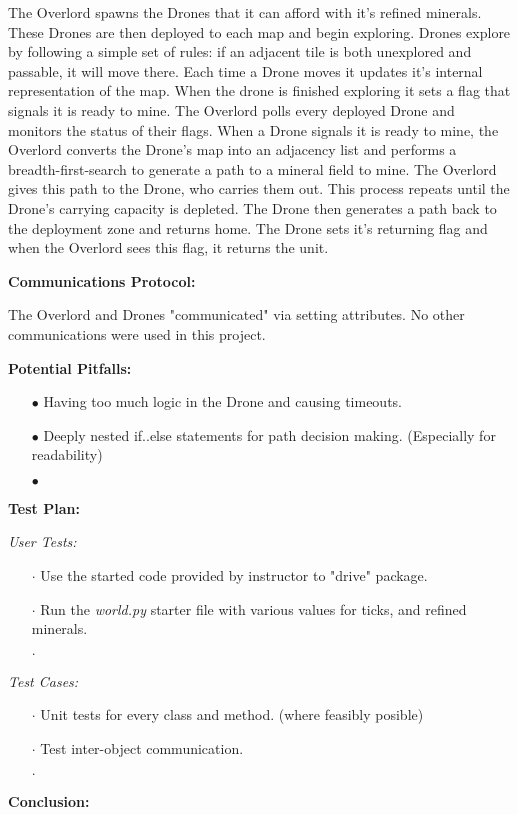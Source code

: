 \documentclass{article}
\begin{document}
The Overlord spawns the Drones that it can afford with it's refined 
minerals.  These Drones are then deployed to each map and begin exploring.
Drones explore by following a simple set of rules: if an adjacent tile is
both unexplored and passable, it will move there. Each time a Drone moves
it updates it's internal representation of the map. When the drone is
finished exploring it sets a flag that signals it is ready to mine.  The 
Overlord polls every deployed Drone and monitors the status of their flags.
When a Drone signals it is ready to mine, the Overlord converts the Drone's
map into an adjacency list and performs a breadth-first-search to generate 
a path to a mineral field to mine.  The Overlord gives this path to the 
Drone, who carries them out. This process repeats until the Drone's 
carrying capacity is depleted.  The Drone then generates a path back to the
deployment zone and returns home.  The Drone sets it's returning flag and
when the Overlord sees this flag, it returns the unit.

\begin{flushleft}
\textbf{Communications Protocol:}
\vspace{.5pc}
\end{flushleft}

The Overlord and Drones "communicated" via setting attributes.  No other 
communications were used in this project.

\begin{flushleft}
\textbf{Potential Pitfalls:}
\vspace{.5pc}
\end{flushleft}

\begin{itemize}
	\item[$\bullet$] Having too much logic in the Drone and causing 
	timeouts.
	\item[$\bullet$] Deeply nested if..else statements for path decision
	making. (Especially for readability)
	\item[$\bullet$] 
\end{itemize}

\begin{flushleft}
\textbf{Test Plan:}
\vspace{.5pc}
\end{flushleft}

\textit{User Tests:}
\begin{itemize}
	\item[$\cdot$] Use the started code provided by instructor to "drive"
	package.
	\item[$\cdot$] Run the \textit{world.py} starter file with various
	values for ticks, and refined minerals.
	\item[$\cdot$] 
\end{itemize}

\textit{Test Cases:}
\begin{itemize}
	\item[$\cdot$] Unit tests for every class and method. (where feasibly 
	posible)
	\item[$\cdot$] Test inter-object communication.
	\item[$\cdot$] 
\end{itemize}

\begin{flushleft}
\textbf{Conclusion:}
\vspace{.5pc}
\end{flushleft}
\end{document}
